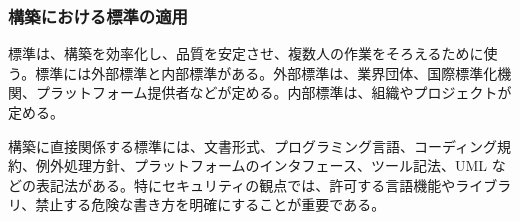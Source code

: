 \subsubsection{構築における標準の適用}

標準は、構築を効率化し、品質を安定させ、複数人の作業をそろえるために使う。標準には外部標準と内部標準がある。外部標準は、業界団体、国際標準化機関、プラットフォーム提供者などが定める。内部標準は、組織やプロジェクトが定める。

構築に直接関係する標準には、文書形式、プログラミング言語、コーディング規約、例外処理方針、プラットフォームのインタフェース、ツール記法、UML などの表記法がある。特にセキュリティの観点では、許可する言語機能やライブラリ、禁止する危険な書き方を明確にすることが重要である。
